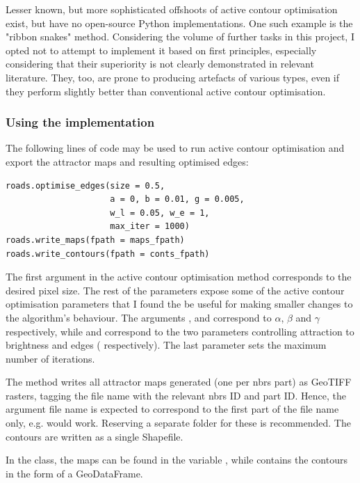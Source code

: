 Lesser known, but more sophisticated offshoots of active contour optimisation exist, but have no open-source Python implementations. One such example is the "ribbon snakes" method. Considering the volume of further tasks in this project, I opted not to attempt to implement it based on first principles, especially considering that their superiority is not clearly demonstrated in relevant literature. They, too, are prone to producing artefacts of various types, even if they perform slightly better than conventional active contour optimisation.

\subsubsection{Using the implementation}

The following lines of code may be used to run active contour optimisation and export the attractor maps and resulting optimised edges:

\begin{verbatim}
roads.optimise_edges(size = 0.5,
                     a = 0, b = 0.01, g = 0.005,
                     w_l = 0.05, w_e = 1,
                     max_iter = 1000)
roads.write_maps(fpath = maps_fpath)
roads.write_contours(fpath = conts_fpath)
\end{verbatim}

The first argument  in the active contour optimisation method corresponds to the desired pixel size. The rest of the parameters expose some of the active contour optimisation parameters that I found the be useful for making smaller changes to the algorithm's behaviour. The arguments ,  and  correspond to $\alpha$, $\beta$ and $\gamma$ respectively, while  and  correspond to the two parameters controlling attraction to brightness and edges (  respectively). The last parameter sets the maximum number of iterations.

The  method writes all attractor maps generated (one per \ac{nbrs} part) as GeoTIFF rasters, tagging the file name with the relevant \ac{nbrs} ID and part ID. Hence, the argument file name is expected to correspond to the first part of the file name only, e.g.  would work. Reserving a separate folder for these is recommended. The contours are written as a single Shapefile.

In the class, the maps can be found in the variable , while  contains the contours in the form of a GeoDataFrame.

